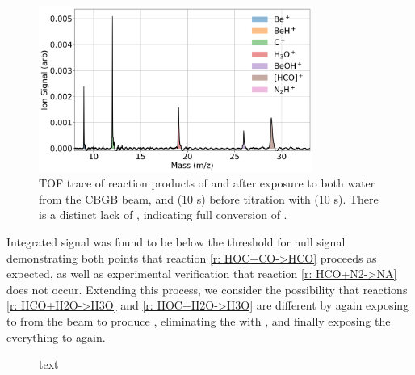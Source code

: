 \begin{figure}[H]
	\centering
	\includegraphics[width=0.8\textwidth]{images/C_H2O_CO_15N2.png}
	\caption{TOF trace of reaction products of  and  after exposure to both water from the CBGB beam, and  (10 s) before titration with  (10 s). There is a distinct lack of , indicating full conversion of .}
	\label{fig: CO N2 TOF}
\end{figure}

Integrated  signal was found to be below the threshold for null signal demonstrating both points that reaction \ref{r: HOC+CO->HCO} proceeds as expected, as well as experimental verification that reaction \ref{r: HCO+N2->NA} does not occur. Extending this process, we consider the possibility that reactions \ref{r: HCO+H2O->H3O} and \ref{r: HOC+H2O->H3O} are different by again exposing  to  from the beam to produce \ce{[HCO]+}, eliminating the  with , and finally exposing the everything to  again. 

\begin{figure}[H]
	\centering
	\caption{text}
	\label{fig: [HCO] rate}
\end{figure}